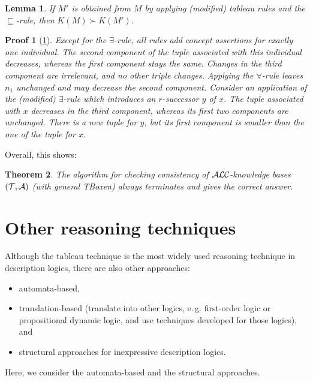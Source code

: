 \documentclass[openany]{scrbook}
\theoremstyle{break}
\newtheorem{Theorem}{Theorem}[chapter]
\newtheorem{Lemma}[Theorem]{Lemma}
\theoremstyle{nonumberbreak}
\theoremstyle{nonumberplain}
\theoremstyle{nonumberbreak}
\newtheorem{Proof}{Proof}
\newcommand{\eg}{e{.}\,g{.}\xspace}
\newcommand{\ALC}{{\cal A}{\cal L}{\cal C}}
\begin{document}
\begin{Lemma}
  \label{4.23}
  If $M'$ is obtained from $M$ by applying (modified) tableau rules
  and the $\sqsubseteq$-rule, then $K(M) \succ K(M')$.
\end{Lemma}

\begin{Proof}[\cref{4.23}]
  Except for the $\exists$-rule, all rules add concept assertions for
  exactly one individual. The second component of the tuple associated
  with this individual decreases, whereas the first component stays
  the same. Changes in the third component are irrelevant, and no
  other triple changes. Applying the $\forall$-rule leaves $n_1$
  unchanged and may decrease the second component. Consider an
  application of the (modified) $\exists$-rule which introduces an
  $r$-successor $y$ of $x$. The tuple associated with $x$ decreases in
  the third component, whereas its first two components are
  unchanged. There is a new tuple for $y$, but its first component is
  smaller than the one of the tuple for $x$.
\end{Proof}

Overall, this shows:
\begin{Theorem}
  \label{4.24}
  The algorithm for checking consistency of $\ALC$-knowledge bases
  $({\cal T}, {\cal A})$ (with general TBoxen) always terminates and
  gives the correct answer.
\end{Theorem}

\chapter{Other reasoning techniques}
\label{chap:5}
Although the tableau technique is the most widely used reasoning
technique in description logics, there are also other approaches:
\begin{itemize}
\item automata-based,
\item translation-based (translate into other logics, \eg first-order
  logic or propositional dynamic logic, and use techniques developed
  for those logics), and
\item structural approaches for inexpressive description logics.
\end{itemize}

Here, we consider the automata-based and the structural approaches.
\end{document}
